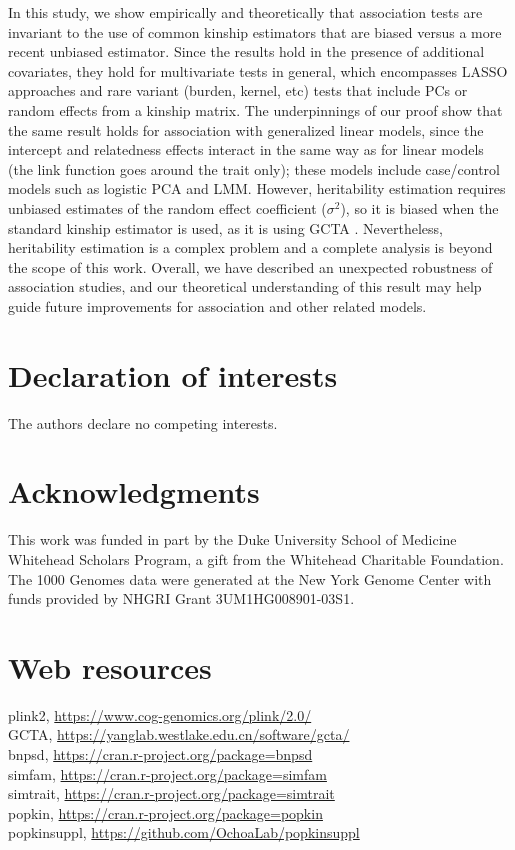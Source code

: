 \documentclass[11pt]{article}
\begin{document}
\begin{linenumbers}
In this study, we show empirically and theoretically that association tests are invariant to the use of common kinship estimators that are biased versus a more recent unbiased estimator.
Since the results hold in the presence of additional covariates, they hold for multivariate tests in general, which encompasses LASSO approaches and rare variant (burden, kernel, etc) tests that include PCs or random effects from a kinship matrix.
The underpinnings of our proof show that the same result holds for association with generalized linear models, since the intercept and relatedness effects interact in the same way as for linear models (the link function goes around the trait only); these models include case/control models such as logistic PCA and LMM.
However, heritability estimation requires unbiased estimates of the random effect coefficient ($\sigma^2$), so it is biased when the standard kinship estimator is used, as it is using GCTA \citep{yang_gcta:_2011, yang_advantages_2014}.
Nevertheless, heritability estimation is a complex problem and a complete analysis is beyond the scope of this work.
Overall, we have described an unexpected robustness of association studies, and our theoretical understanding of this result may help guide future improvements for association and other related models.



\section*{Declaration of interests}
The authors declare no competing interests.

\section*{Acknowledgments}
This work was funded in part by the Duke University School of Medicine Whitehead Scholars Program, a gift from the Whitehead Charitable Foundation.
The 1000 Genomes data were generated at the New York Genome Center with funds provided by NHGRI Grant 3UM1HG008901-03S1.

\section*{Web resources}
plink2, \url{https://www.cog-genomics.org/plink/2.0/}\\
GCTA, \url{https://yanglab.westlake.edu.cn/software/gcta/}\\
bnpsd, \url{https://cran.r-project.org/package=bnpsd}\\
simfam, \url{https://cran.r-project.org/package=simfam}\\
simtrait, \url{https://cran.r-project.org/package=simtrait}\\
popkin, \url{https://cran.r-project.org/package=popkin}\\
popkinsuppl, \url{https://github.com/OchoaLab/popkinsuppl}


\end{linenumbers}
\end{document}
